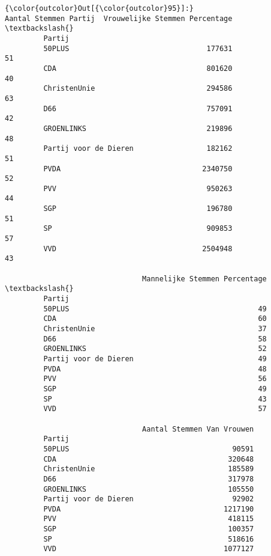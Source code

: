 \documentclass{article}
\begin{document}
            \begin{Verbatim}[commandchars=\\\{\}]
{\color{outcolor}Out[{\color{outcolor}95}]:}                        Aantal Stemmen Partij  Vrouwelijke Stemmen Percentage  \textbackslash{}
         Partij                                                                         
         50PLUS                                177631                              51   
         CDA                                   801620                              40   
         ChristenUnie                          294586                              63   
         D66                                   757091                              42   
         GROENLINKS                            219896                              48   
         Partij voor de Dieren                 182162                              51   
         PVDA                                 2340750                              52   
         PVV                                   950263                              44   
         SGP                                   196780                              51   
         SP                                    909853                              57   
         VVD                                  2504948                              43   
         
                                Mannelijke Stemmen Percentage  \textbackslash{}
         Partij                                                 
         50PLUS                                            49   
         CDA                                               60   
         ChristenUnie                                      37   
         D66                                               58   
         GROENLINKS                                        52   
         Partij voor de Dieren                             49   
         PVDA                                              48   
         PVV                                               56   
         SGP                                               49   
         SP                                                43   
         VVD                                               57   
         
                                Aantal Stemmen Van Vrouwen  
         Partij                                             
         50PLUS                                      90591  
         CDA                                        320648  
         ChristenUnie                               185589  
         D66                                        317978  
         GROENLINKS                                 105550  
         Partij voor de Dieren                       92902  
         PVDA                                      1217190  
         PVV                                        418115  
         SGP                                        100357  
         SP                                         518616  
         VVD                                       1077127  
\end{Verbatim}
        
\end{document}
